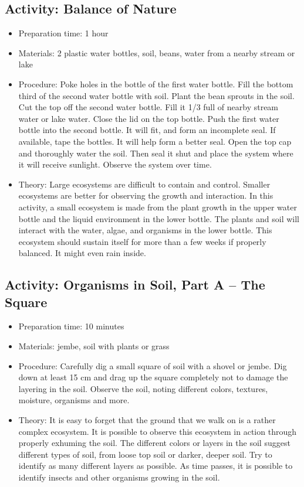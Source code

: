 \subsection{Activity: Balance of Nature}
\begin{itemize}
\item{Preparation time: 1 hour}
\item{Materials: 2 plastic water bottles, soil, beans, water from a nearby stream or lake}
\item{Procedure: Poke holes in the bottle of the first water bottle. Fill the bottom third of the second water bottle with soil. Plant the bean sprouts in the soil. Cut the top off the second water bottle. Fill it 1/3 full of nearby stream water or lake water. Close the lid on the top bottle. Push the first water bottle into the second bottle. It will fit, and form an incomplete seal. If available, tape the bottles. It will help form a better seal. Open the top cap and thoroughly water the soil. Then seal it shut and place the system where it will receive sunlight. Observe the system over time. }
\item{Theory: Large ecosystems are difficult to contain and control. Smaller ecosystems are better for observing the growth and interaction. In this activity, a small ecosystem is made from the plant growth in the upper water bottle and the liquid environment in the lower bottle. The plants and soil will interact with the water, algae, and organisms in the lower bottle. This ecosystem should sustain itself for more than a few weeks if properly balanced. It might even rain inside.}
\end{itemize}

\subsection{Activity: Organisms in Soil, Part A – The Square}
\begin{itemize}
\item{Preparation time: 10 minutes}
\item{Materials: jembe, soil with plants or grass}
\item{Procedure: Carefully dig a small square of soil with a shovel or jembe. Dig down at least 15 cm and drag up the square completely not to damage the layering in the soil. Observe the soil, noting different colors, textures, moisture, organisms and more.}
\item{Theory: It is easy to forget that the ground that we walk on is a rather complex ecosystem. It is possible to observe this ecosystem in action through properly exhuming the soil. The different colors or layers in the soil suggest different types of soil, from loose top soil or darker, deeper soil. Try to identify as many different layers as possible. As time passes, it is possible to identify insects and other organisms growing in the soil.}
\end{itemize}

